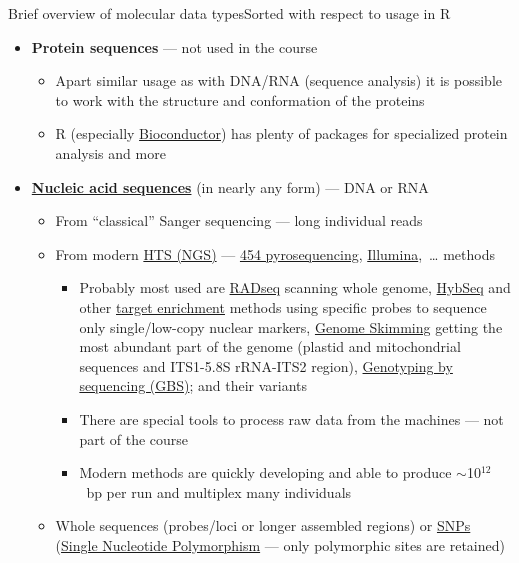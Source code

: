 \documentclass[compress, ucs, xelatex, 11pt, xcolor=svgnames, aspectratio=169,
	hyperref={
		bookmarks=true,
		unicode=true,
		colorlinks=true,
		pdftitle={Molecular data in R},
		plainpages=false,
		pdfauthor={Vojtech Zeisek},
		pdfsubject={Course about phylogeny and evolution in R},
		pdfcreator={XeLaTeX},
		pdfkeywords={R, evolution, phylogeny, molecular data},
		linkcolor=Crimson, %
		anchorcolor=Magenta, %
		citecolor=Magenta, %
		filecolor=Magenta, %
		menucolor=Magenta, %
		urlcolor=DodgerBlue, %
		pdftex},
	url={hyphens, lowtilde} %
	]{beamer}
\begin{document}
\begin{frame}[allowframebreaks]{Brief overview of molecular data types}{Sorted with respect to usage in R}
\begin{itemize}
\begin{itemize}
\begin{itemize}
			\end{itemize}
		\end{itemize}
		\item \textbf{Protein sequences} --- not used in the course
		\begin{itemize}
			\item Apart similar usage as with DNA/RNA (sequence analysis) it is possible to work with the structure and conformation of the proteins
			\item R (especially \href{https://bioconductor.org/}{Bioconductor}) has plenty of packages for specialized protein analysis and more
		\end{itemize}
		\item \textbf{\href{https://en.wikipedia.org/wiki/Nucleic_acid_sequence}{Nucleic acid sequences}} (in nearly any form) --- DNA or RNA
		\begin{itemize}
			\item From \enquote{classical} Sanger sequencing --- long individual reads
			\item From modern \href{https://en.wikipedia.org/wiki/DNA_sequencing\#High-throughput_methods}{HTS (NGS)} --- \href{https://en.wikipedia.org/wiki/Pyrosequencing}{454 pyrosequencing}, \href{https://en.wikipedia.org/wiki/Illumina_dye_sequencing}{Illumina},~\ldots{ }methods
			\begin{itemize}
				\item Probably most used are \href{https://en.wikipedia.org/wiki/Restriction_site_associated_DNA_markers}{RADseq} scanning whole genome, \href{https://bsapubs.onlinelibrary.wiley.com/doi/abs/10.3732/apps.1400042}{HybSeq} and other \href{https://en.wikipedia.org/wiki/Exome_sequencing}{target enrichment} methods using specific probes to sequence only single/low-copy nuclear markers, \href{https://bsapubs.onlinelibrary.wiley.com/doi/abs/10.3732/ajb.1100335}{Genome Skimming} getting the most abundant part of the genome (plastid and mitochondrial sequences and ITS1-5.8S rRNA-ITS2 region), \href{https://en.wikipedia.org/wiki/Genotyping_by_sequencing}{Genotyping by sequencing (GBS)}; and their variants
				\item There are special tools to process raw data from the machines --- not part of the course
				\item Modern methods are quickly developing and able to produce $\sim$10$^{12}$~bp per run and multiplex many individuals
			\end{itemize}
			\item Whole sequences (probes/loci or longer assembled regions) or \href{https://en.wikipedia.org/wiki/Single-nucleotide_polymorphism}{SNPs} (\href{https://en.wikipedia.org/wiki/SNP_genotyping}{Single Nucleotide Polymorphism} --- only polymorphic sites are retained)

\end{itemize}
\end{itemize}
\end{frame}
\end{document}
